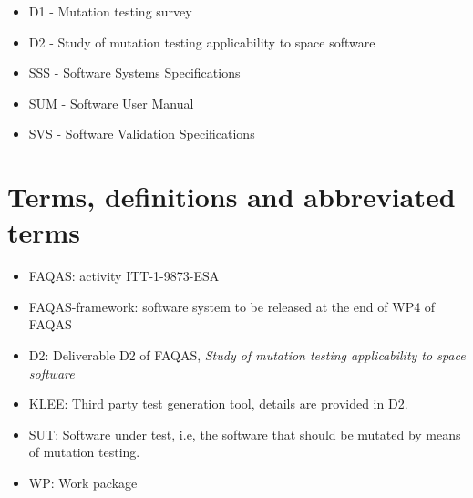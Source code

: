 \begin{itemize}
\item{D1 - Mutation testing survey}
\item{D2 - Study of mutation testing applicability to space software}
\item{SSS - Software Systems Specifications}
\item{SUM - Software User Manual}
\item{SVS - Software Validation Specifications}
\end{itemize}

\chapter{Terms, definitions and abbreviated terms}

\begin{itemize}
\item{FAQAS}: activity ITT-1-9873-ESA
\item{FAQAS-framework}: software system to be released at the end of WP4 of FAQAS
\item{D2}: Deliverable D2 of FAQAS, \emph{Study of mutation testing applicability to space software}
\item{KLEE}: Third party test generation tool, details are provided in D2.
\item{SUT}: Software under test, i.e, the software that should be mutated by means of mutation testing.
\item{WP}: Work package
\end{itemize}

\clearpage
 

